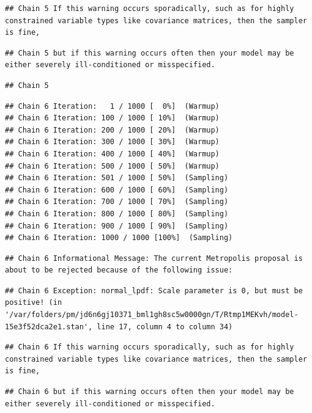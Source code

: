 \documentclass[
]{book}
\begin{document}
\begin{verbatim}
## Chain 5 If this warning occurs sporadically, such as for highly constrained variable types like covariance matrices, then the sampler is fine,
\end{verbatim}

\begin{verbatim}
## Chain 5 but if this warning occurs often then your model may be either severely ill-conditioned or misspecified.
\end{verbatim}

\begin{verbatim}
## Chain 5
\end{verbatim}

\begin{verbatim}
## Chain 6 Iteration:   1 / 1000 [  0%]  (Warmup) 
## Chain 6 Iteration: 100 / 1000 [ 10%]  (Warmup) 
## Chain 6 Iteration: 200 / 1000 [ 20%]  (Warmup) 
## Chain 6 Iteration: 300 / 1000 [ 30%]  (Warmup) 
## Chain 6 Iteration: 400 / 1000 [ 40%]  (Warmup) 
## Chain 6 Iteration: 500 / 1000 [ 50%]  (Warmup) 
## Chain 6 Iteration: 501 / 1000 [ 50%]  (Sampling) 
## Chain 6 Iteration: 600 / 1000 [ 60%]  (Sampling) 
## Chain 6 Iteration: 700 / 1000 [ 70%]  (Sampling) 
## Chain 6 Iteration: 800 / 1000 [ 80%]  (Sampling) 
## Chain 6 Iteration: 900 / 1000 [ 90%]  (Sampling) 
## Chain 6 Iteration: 1000 / 1000 [100%]  (Sampling)
\end{verbatim}

\begin{verbatim}
## Chain 6 Informational Message: The current Metropolis proposal is about to be rejected because of the following issue:
\end{verbatim}

\begin{verbatim}
## Chain 6 Exception: normal_lpdf: Scale parameter is 0, but must be positive! (in '/var/folders/pm/jd6n6gj10371_bml1gh8sc5w0000gn/T/Rtmp1MEKvh/model-15e3f52dca2e1.stan', line 17, column 4 to column 34)
\end{verbatim}

\begin{verbatim}
## Chain 6 If this warning occurs sporadically, such as for highly constrained variable types like covariance matrices, then the sampler is fine,
\end{verbatim}

\begin{verbatim}
## Chain 6 but if this warning occurs often then your model may be either severely ill-conditioned or misspecified.
\end{verbatim}
\end{document}
